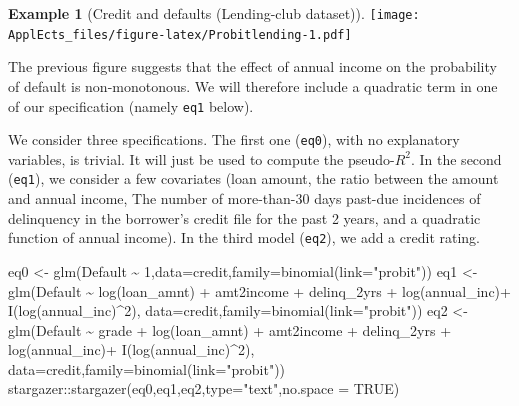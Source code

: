 \documentclass[
  12pt,
]{book}
\newenvironment{Shaded}{\begin{snugshade}}{\end{snugshade}}
\newcommand{\AttributeTok}[1]{\textcolor[rgb]{0.77,0.63,0.00}{#1}}
\newcommand{\ConstantTok}[1]{\textcolor[rgb]{0.00,0.00,0.00}{#1}}
\newcommand{\DecValTok}[1]{\textcolor[rgb]{0.00,0.00,0.81}{#1}}
\newcommand{\FunctionTok}[1]{\textcolor[rgb]{0.00,0.00,0.00}{#1}}
\newcommand{\NormalTok}[1]{#1}
\newcommand{\OtherTok}[1]{\textcolor[rgb]{0.56,0.35,0.01}{#1}}
\newcommand{\SpecialCharTok}[1]{\textcolor[rgb]{0.00,0.00,0.00}{#1}}
\newcommand{\StringTok}[1]{\textcolor[rgb]{0.31,0.60,0.02}{#1}}
\theoremstyle{definition}
\theoremstyle{definition}
\newtheorem{example}{Example}[chapter]
\theoremstyle{definition}
\theoremstyle{definition}
\theoremstyle{remark}
\begin{document}
\begin{example}[Credit and defaults (Lending-club dataset)]
\texttt{[image: ApplEcts\_files/figure-latex/Probitlending-1.pdf]}

The previous figure suggests that the effect of annual income on the probability of default is non-monotonous. We will therefore include a quadratic term in one of our specification (namely \texttt{eq1} below).

We consider three specifications. The first one (\texttt{eq0}), with no explanatory variables, is trivial. It will just be used to compute the pseudo-\(R^2\). In the second (\texttt{eq1}), we consider a few covariates (loan amount, the ratio between the amount and annual income, The number of more-than-30 days past-due incidences of delinquency in the borrower's credit file for the past 2 years, and a quadratic function of annual income). In the third model (\texttt{eq2}), we add a credit rating.

\begin{Shaded}
\begin{Highlighting}[]
\NormalTok{eq0 }\OtherTok{\textless{}{-}} \FunctionTok{glm}\NormalTok{(Default }\SpecialCharTok{\textasciitilde{}} \DecValTok{1}\NormalTok{,}\AttributeTok{data=}\NormalTok{credit,}\AttributeTok{family=}\FunctionTok{binomial}\NormalTok{(}\AttributeTok{link=}\StringTok{"probit"}\NormalTok{))}
\NormalTok{eq1 }\OtherTok{\textless{}{-}} \FunctionTok{glm}\NormalTok{(Default }\SpecialCharTok{\textasciitilde{}} \FunctionTok{log}\NormalTok{(loan\_amnt) }\SpecialCharTok{+}\NormalTok{ amt2income }\SpecialCharTok{+}\NormalTok{ delinq\_2yrs }\SpecialCharTok{+} 
             \FunctionTok{log}\NormalTok{(annual\_inc)}\SpecialCharTok{+} \FunctionTok{I}\NormalTok{(}\FunctionTok{log}\NormalTok{(annual\_inc)}\SpecialCharTok{\^{}}\DecValTok{2}\NormalTok{),}
           \AttributeTok{data=}\NormalTok{credit,}\AttributeTok{family=}\FunctionTok{binomial}\NormalTok{(}\AttributeTok{link=}\StringTok{"probit"}\NormalTok{))}
\NormalTok{eq2 }\OtherTok{\textless{}{-}} \FunctionTok{glm}\NormalTok{(Default }\SpecialCharTok{\textasciitilde{}}\NormalTok{ grade }\SpecialCharTok{+} \FunctionTok{log}\NormalTok{(loan\_amnt) }\SpecialCharTok{+}\NormalTok{ amt2income }\SpecialCharTok{+}\NormalTok{ delinq\_2yrs }\SpecialCharTok{+} 
             \FunctionTok{log}\NormalTok{(annual\_inc)}\SpecialCharTok{+} \FunctionTok{I}\NormalTok{(}\FunctionTok{log}\NormalTok{(annual\_inc)}\SpecialCharTok{\^{}}\DecValTok{2}\NormalTok{),}
           \AttributeTok{data=}\NormalTok{credit,}\AttributeTok{family=}\FunctionTok{binomial}\NormalTok{(}\AttributeTok{link=}\StringTok{"probit"}\NormalTok{))}
\NormalTok{stargazer}\SpecialCharTok{::}\FunctionTok{stargazer}\NormalTok{(eq0,eq1,eq2,}\AttributeTok{type=}\StringTok{"text"}\NormalTok{,}\AttributeTok{no.space =} \ConstantTok{TRUE}\NormalTok{)}
\end{Highlighting}
\end{Shaded}


\end{example}
\end{document}
